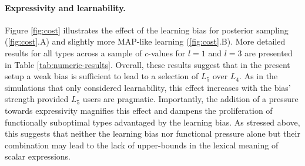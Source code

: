 \documentclass[a4paper]{article}
\begin{document}
\paragraph{Expressivity and learnability.} Figure \ref{fig:cost} illustrates the effect of the learning bias for posterior sampling (\ref{fig:cost}.A) and slightly more MAP-like learning (\ref{fig:cost}.B). More detailed results for all types across a sample of $c$-values for $l = 1$ and $l = 3$ are presented in Table \ref{tab:numeric-results}. Overall, these results suggest that in the present setup a weak bias is sufficient to lead to a selection of $L_5$ over $L_4$. As in the simulations that only considered learnability, this effect increases with the bias' strength provided $L_5$ users are pragmatic. Importantly, the addition of a pressure towards expressivity magnifies this effect and dampens the proliferation of functionally suboptimal types advantaged by the learning bias. As stressed above, this suggests that neither the learning bias nor functional pressure alone but their combination may lead to the lack of upper-bounds in the lexical meaning of scalar expressions.
\end{document}
